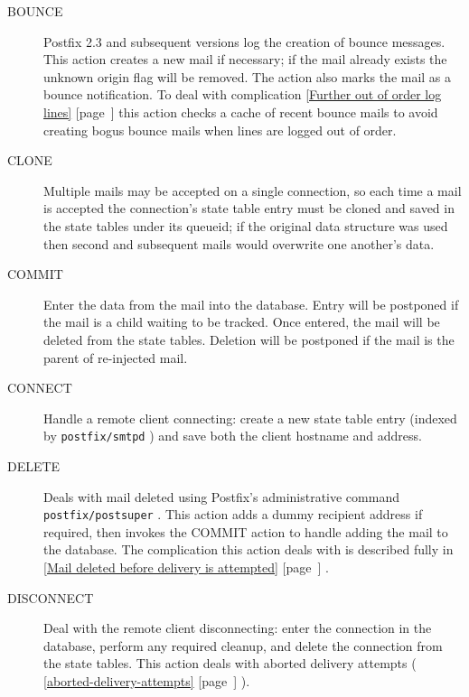 \documentclass[a4paper,12pt,draft]{article}
\newcommand{\refwithpage}[1]{%
    \empty{}\ref{#1} [page~\pageref{#1}]%
}
\newcommand{\sectionref}[1]{%
    \textsection{}\refwithpage{#1}%
}
\newcommand{\daemon}[1]{%
    \texttt{postfix/#1}%
}
\newcounter{dummy}
\begin{document}
\begin{description}

    \item [BOUNCE] Postfix 2.3 and subsequent versions log the creation of
        bounce messages.  This action creates a new mail if necessary; if
        the mail already exists the unknown origin flag will be removed.
        The action also marks the mail as a bounce notification.  To deal
        with complication \sectionref{Further out of order log lines} this
        action checks a cache of recent bounce mails to avoid creating
        bogus bounce mails when lines are logged out of order.

    \item [CLONE] Multiple mails may be accepted on a single connection, so
        each time a mail is accepted the connection's state table entry
        must be cloned and saved in the state tables under its queueid; if
        the original data structure was used then second and subsequent
        mails would overwrite one another's data.

    \item [COMMIT] Enter the data from the mail into the database. Entry
        will be postponed if the mail is a child waiting to be tracked.
        Once entered, the mail will be deleted from the state tables.
        Deletion will be postponed if the mail is the parent of re-injected
        mail.

    \item [CONNECT] Handle a remote client connecting: create a new state
        table entry (indexed by \daemon{smtpd} \pid{}) and save both the
        client hostname and \IP{} address.

    \item [DELETE] Deals with mail deleted using Postfix's administrative
        command \daemon{postsuper}.  This action adds a dummy recipient
        address if required, then invokes the COMMIT action to handle
        adding the mail to the database.  The complication this action
        deals with is described fully in \sectionref{Mail deleted before
        delivery is attempted}.  

    \item [DISCONNECT] Deal with the remote client disconnecting: enter the
        connection in the database, perform any required cleanup, and
        delete the connection from the state tables.  This action deals
        with aborted delivery attempts
        (\sectionref{aborted-delivery-attempts}).


\end{description}
\end{document}
